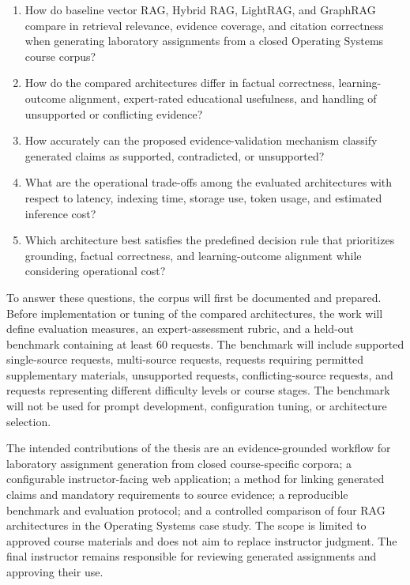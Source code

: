 \documentclass[12pt,a4paper]{report}
\numberwithin{equation}{chapter}
\begin{document}
\begin{enumerate}
    \item How do baseline vector RAG, Hybrid RAG, LightRAG, and GraphRAG compare in retrieval relevance, evidence coverage, and citation correctness when generating laboratory assignments from a closed Operating Systems course corpus?
    \item How do the compared architectures differ in factual correctness, learning-outcome alignment, expert-rated educational usefulness, and handling of unsupported or conflicting evidence?
    \item How accurately can the proposed evidence-validation mechanism classify generated claims as supported, contradicted, or unsupported?
    \item What are the operational trade-offs among the evaluated architectures with respect to latency, indexing time, storage use, token usage, and estimated inference cost?
    \item Which architecture best satisfies the predefined decision rule that prioritizes grounding, factual correctness, and learning-outcome alignment while considering operational cost?
\end{enumerate}

To answer these questions, the corpus will first be documented and prepared. Before implementation or tuning of the compared architectures, the work will define evaluation measures, an expert-assessment rubric, and a held-out benchmark containing at least 60 requests. The benchmark will include supported single-source requests, multi-source requests, requests requiring permitted supplementary materials, unsupported requests, conflicting-source requests, and requests representing different difficulty levels or course stages. The benchmark will not be used for prompt development, configuration tuning, or architecture selection.

The intended contributions of the thesis are an evidence-grounded workflow for laboratory assignment generation from closed course-specific corpora; a configurable instructor-facing web application; a method for linking generated claims and mandatory requirements to source evidence; a reproducible benchmark and evaluation protocol; and a controlled comparison of four RAG architectures in the Operating Systems case study. The scope is limited to approved course materials and does not aim to replace instructor judgment. The final instructor remains responsible for reviewing generated assignments and approving their use.
\end{document}

